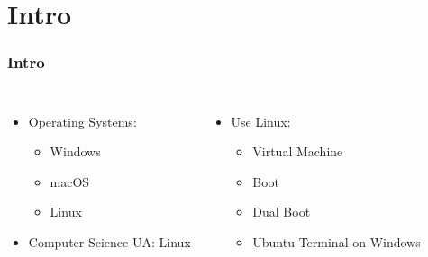 

\section{Intro}
\begin{frame}
	\frametitle{Intro}

	\begin{columns}[c]
        	\begin{itemize}
            	\item Operating Systems:
                \begin{itemize}
            		\item Windows
                    \item macOS
                    \item Linux
            	\end{itemize}
                \item Computer Science UA: Linux
            \end{itemize}
            \begin{itemize}
                \item Use Linux:
                \begin{itemize}
            		\item Virtual Machine
                    \item Boot
                    \item Dual Boot
                    \item Ubuntu Terminal on Windows
            	\end{itemize}
            \end{itemize}
            \centering

\end{columns}
\end{frame}
